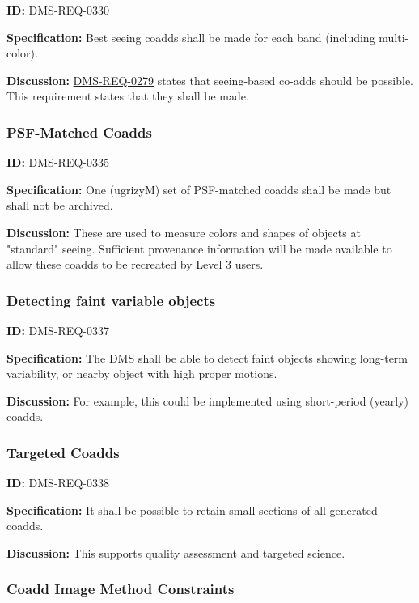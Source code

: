 \documentclass[SE,toc,lsstdraft]{lsstdoc}
\begin{document}
\label{DMS-REQ-0330}
\textbf{ID:} DMS-REQ-0330

\textbf{Specification:} Best seeing coadds shall be made for each band (including multi-color).

\textbf{Discussion:} \hyperref[DMS-REQ-0279]{DMS-REQ-0279} states that seeing-based co-adds should be possible. This requirement states that they shall be made.




\subsubsection{PSF-Matched Coadds}

\label{DMS-REQ-0335}
\textbf{ID:} DMS-REQ-0335

\textbf{Specification:} One (ugrizyM) set of PSF-matched coadds shall be made but shall not be archived.

\textbf{Discussion:} These are used to measure colors and shapes of objects at "standard" seeing. Sufficient provenance information will be made available to allow these coadds to be recreated by Level 3 users.




\subsubsection{Detecting faint variable objects}

\label{DMS-REQ-0337}
\textbf{ID:} DMS-REQ-0337

\textbf{Specification: }The DMS shall be able to detect faint objects showing long-term variability, or nearby object with high proper motions.

\textbf{Discussion:} For example, this could be implemented using short-period (yearly) coadds.




\subsubsection{Targeted Coadds}

\label{DMS-REQ-0338}
\textbf{ID:} DMS-REQ-0338

\textbf{Specification:} It shall be possible to retain small sections of all generated coadds.

\textbf{Discussion:} This supports quality assessment and targeted science.




\subsubsection{Coadd Image Method Constraints}
\end{document}
